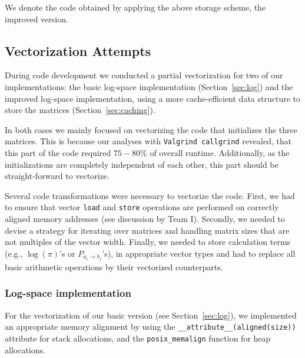 \documentclass[runningheads,a4paper]{llncs}
\begin{document}

We denote the code obtained by applying the above storage scheme, the improved version.

\subsection{Vectorization Attempts}
\label{sec:vector}
During code development we conducted a partial vectorization for two of our implementations:
the basic log-space implementation (Section~\ref{sec:log}) and the improved log-space implementation, using a more
cache-efficient data structure to store the matrices (Section~\ref{sec:caching}).

In both cases we mainly focused on vectorizing the code that initializes the three matrices.
This is because our analyses with \texttt{Valgrind callgrind} revealed, that this
part of the code required $75-80\%$ of overall runtime.
Additionally, as the initializations are completely independent of each other, this part should be straight-forward to vectorize.

Several code transformations were necessary to vectorize the code.
First, we had to ensure that vector \texttt{load} and \texttt{store} operations are performed on correctly aligned memory addresses (see discussion by Team I).
Secondly, we needed to devise a strategy for iterating over matrices and handling matrix sizes that are not multiples of the vector width.
Finally, we needed to store calculation terms (e.g., $\log(\pi)$'s or $P_{a_i \to b_j}$'s), in appropriate vector types and
had to replace all basic arithmetic operations by their vectorized counterparts.

\subsubsection{Log-space implementation}
For the vectorization of our basic version (see Section~\ref{sec:log}), we implemented an appropriate memory alignment
by using the \texttt{\_\_attribute\_\_(aligned(\texttt{size}))} attribute for stack allocations,
and the \texttt{posix\_memalign} function for heap allocations.
\end{document}
